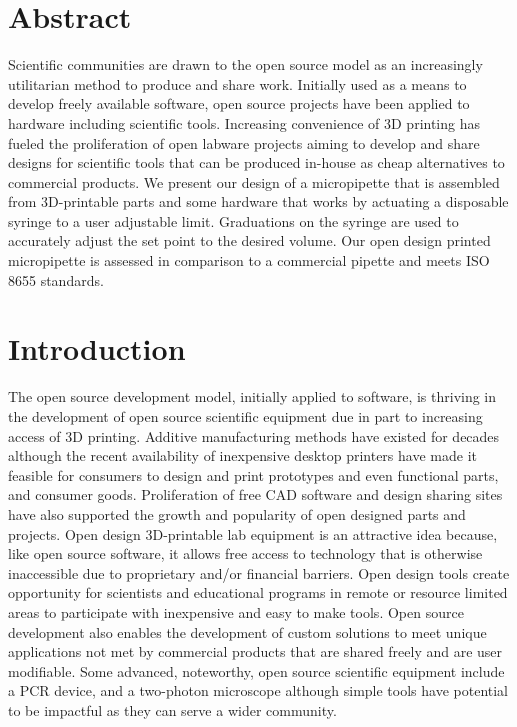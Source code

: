 \documentclass[10pt,letterpaper]{article}
\begin{document}
\section*{Abstract}
Scientific communities are drawn to the open source model as an increasingly utilitarian method to produce and share work.
Initially used as a means to develop freely available software, open source projects have been applied to hardware including scientific tools.
Increasing convenience of 3D printing has fueled the proliferation of open labware projects aiming to develop and share designs for scientific tools that can be produced in-house as cheap alternatives to commercial products.
We present our design of a micropipette that is assembled from 3D-printable parts and some hardware that works by actuating a disposable syringe to a user adjustable limit.
Graduations on the syringe are used to accurately adjust the set point to the desired volume.  
Our open design printed micropipette is assessed in comparison to a commercial pipette and meets ISO 8655 standards.

\linenumbers

\section*{Introduction}
The open source development model, initially applied to software, is thriving in the development of open source scientific equipment due in part to increasing access of 3D printing\cite{Baden2015,Pearce2013}.
Additive manufacturing methods have existed for decades although the recent availability of inexpensive desktop printers\cite{MakerbotIndustries,RepRap} have made it feasible for consumers to design and print prototypes and even functional parts, and consumer goods\cite{Fullerton2014,Wittbrodt2013}.
Proliferation of free CAD software\cite{OpenScad,Blender,SketchUp,123D} and design sharing sites\cite{Thingiverse,NationalInstitutesofHealth,GrabCAD,GitHubInc} have also supported the growth and popularity of open designed parts and projects.
Open design 3D-printable lab equipment is an attractive idea because, like open source software, it allows free access to technology that is otherwise inaccessible due to proprietary and/or financial barriers. 
Open design tools create opportunity for scientists and educational programs in remote or resource limited areas to participate with inexpensive and easy to make tools\cite{Marzullo2012,Lang2011,Fobel2013,Baker2014,Cybulski2014}.
Open source development also enables the development of custom solutions to meet unique applications not met by commercial products that are shared freely and are user modifiable\cite{Fullerton2014,Pearce2012,Rankin2014,Sulkin2013,Dryden2015,DaCosta2014,Tek2008}.
Some advanced, noteworthy, open source scientific equipment include a PCR device\cite{ChaiBiotechnologiesInc2015}, and a two-photon microscope\cite{Rosenegger2014} although simple tools have potential to be impactful as they can serve a wider community.
\end{document}
